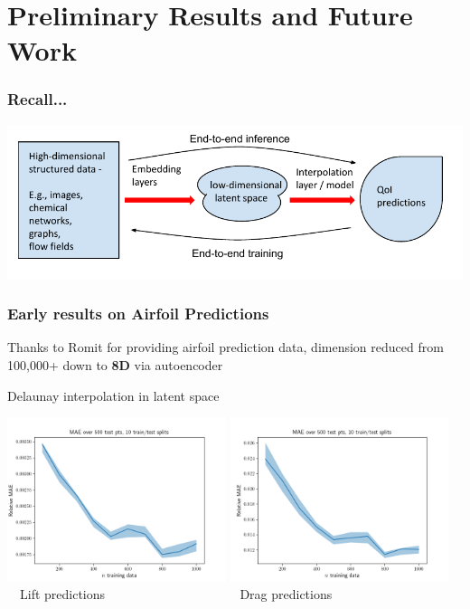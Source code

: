 \documentclass[aspectratio=169]{beamer}
\begin{document}
\section{Preliminary Results and Future Work}

\begin{frame}
\frametitle{Recall...}

\includegraphics{../img/delaunay_new/interpolating_latent_space.pdf}

\end{frame}

\begin{frame}
\frametitle{Early results on Airfoil Predictions}

Thanks to Romit for providing airfoil prediction data,
dimension reduced from 100,000+  down to {\bf 8D} via autoencoder


Delaunay interpolation in latent space

\medskip

\begin{center}
\includegraphics[width=0.48\textwidth]{../img/delaunay_new/latent_delaunay_lift.png}
\includegraphics[width=0.48\textwidth]{../img/delaunay_new/latent_delaunay_drag.png}\\
$\quad$Lift predictions $\qquad\qquad\qquad\qquad\qquad$ Drag predictions
\end{center}

\end{frame}
\end{document}
